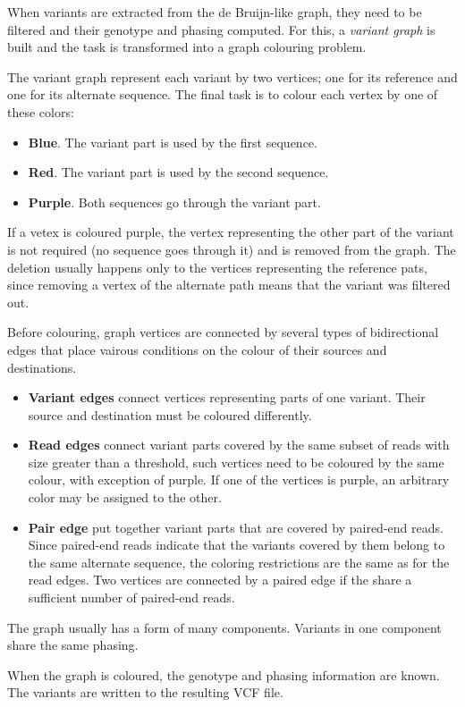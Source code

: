 When variants are extracted from the de Bruijn-like graph, they need to be filtered and their genotype and phasing computed. For this, a \textit{variant graph} is built and the task is transformed into a graph colouring problem.

The variant graph represent each variant by two vertices; one for its reference and one for its alternate sequence. The final task is to colour each vertex by one of these colors:
\begin{itemize}
\item \textbf{Blue}. The variant part is used by the first sequence.
\item \textbf{Red}. The variant part is used by the second sequence.
\item \textbf{Purple}. Both sequences go through the variant part.
\end{itemize}

If a vetex is coloured purple, the vertex representing the other part of the variant is not required (no sequence goes through it) and is removed from the graph. The deletion usually happens only to the vertices representing the reference pats, since removing a vertex of the alternate path means that the variant was filtered out.

Before colouring, graph vertices are connected by several types of bidirectional edges that place vairous conditions on the colour of their sources and destinations.
\begin{itemize}
\item \textbf{Variant edges} connect vertices representing parts of one variant. Their source and destination must be coloured differently.
\item \textbf{Read edges} connect variant parts covered by the same subset of reads with size greater than a threshold, such vertices need to be coloured by the same colour, with exception of purple. If one of the vertices is purple, an arbitrary color may be assigned
to the other.
\item \textbf{Pair edge} put together variant parts that are covered by paired-end reads. Since paired-end reads indicate that the variants covered by them belong to the same alternate sequence, the coloring restrictions are the same as for the read edges. Two vertices are connected by a paired edge if the share a sufficient number of paired-end reads.
\end{itemize}

The graph usually has a form of many components. Variants in one component share the same phasing.

When the graph is coloured, the genotype and phasing information are known. The variants are written to the resulting VCF file.